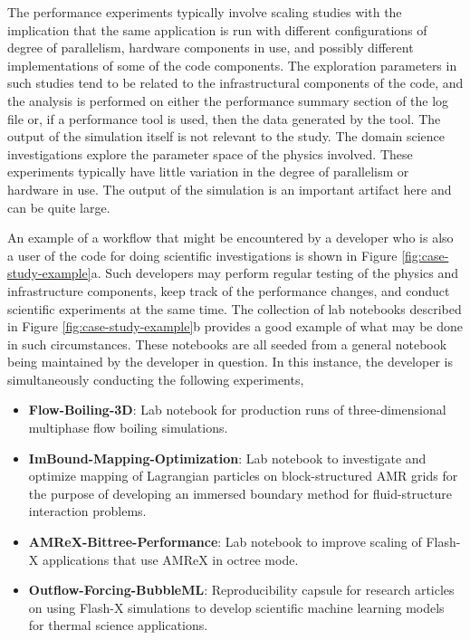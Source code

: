 \documentclass{IEEEcsmag}
\begin{document}
The performance experiments typically involve scaling studies with the implication that the same application is run with different configurations of degree of parallelism, hardware components in use, and possibly different implementations of some of the code components. The exploration parameters in such studies tend to be related to the infrastructural components of the code, and the analysis is performed on either the performance summary section of the log file or, if a performance tool is used, then the data generated by the tool. The output of the simulation itself is not relevant to the study. The domain science investigations explore the parameter space of the physics involved. These experiments typically have little variation in the degree of parallelism or hardware in use. The output of the simulation is an important artifact here and can be quite large. 

An example of a workflow that might be encountered by a developer who is also a user of the code for doing scientific investigations is shown in Figure \ref{fig:case-study-example}a. Such developers may perform regular testing of the physics and infrastructure components, keep track of the performance changes, and conduct scientific experiments at the same time.  The collection of lab notebooks \cite{Lab-Notebooks} described in Figure \ref{fig:case-study-example}b provides a good example of what may be done in such circumstances. These notebooks are all seeded from a general notebook \cite{Multiphysics-Simulations} being maintained by the developer in question. In this instance, the developer is simultaneously conducting the following experiments,

\begin{itemize}
    \item \textbf{Flow-Boiling-3D}: Lab notebook for production runs of three-dimensional multiphase flow boiling simulations.
    \item \textbf{ImBound-Mapping-Optimization}: Lab notebook to investigate and optimize mapping of Lagrangian particles on block-structured AMR grids for the purpose of developing an immersed boundary method for fluid-structure interaction problems.
    \item \textbf{AMReX-Bittree-Performance}: Lab notebook to improve scaling of Flash-X applications that use AMReX in octree mode.
    \item \textbf{Outflow-Forcing-BubbleML}: Reproducibility capsule for research articles on using Flash-X simulations to develop scientific machine learning models for thermal science applications. 
\end{itemize}
\end{document}
